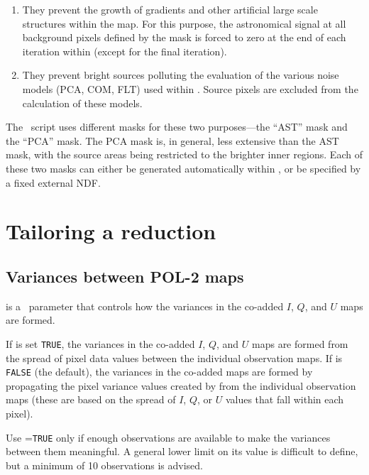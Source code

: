 \begin{enumerate}
\item They prevent the growth of gradients and other artificial large
  scale structures within the map.  For this purpose, the astronomical
  signal at all background pixels defined by the mask is forced to
  zero at the end of each iteration within  (except for the
  final iteration).
\item They prevent bright sources polluting the evaluation of the
  various noise models (PCA, COM, FLT) used within . Source
  pixels are excluded from the calculation of these models.
\end{enumerate}


The \poltwomap\ script uses different masks for these two purposes---the
``AST'' mask and the ``PCA'' mask.  The PCA mask is, in general, less
extensive than the AST mask, with the source areas being restricted to
the brighter inner regions.  Each of these two masks can either be
generated automatically within \poltwomap, or be specified by a fixed
external NDF.



\section{Tailoring a reduction}
\label{sec:tailoredDR}

\subsection*{Variances between POL-2 maps}

 is a \poltwomap\ parameter that controls how the variances in the
co-added $I$, $Q$, and $U$ maps are formed.

If  is set \texttt{TRUE}, the variances in the co-added $I$, $Q$, and $U$ maps
are formed from the spread of pixel data values between the individual
observation maps. If  is \texttt{FALSE} (the default), the variances in
the co-added maps are formed by propagating the pixel variance values
created by  from the individual observation maps (these are
based on the spread of $I$, $Q$, or $U$ values that fall within each pixel).

Use =\texttt{TRUE} only if enough observations are available to make the
variances between them meaningful. A general lower limit on its value
is difficult to define, but a minimum of 10 observations is advised.


